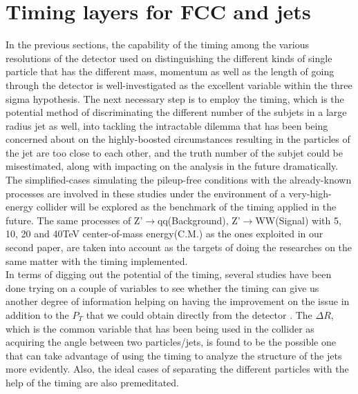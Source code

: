 \section{Timing layers for FCC and jets}
In the previous sections, the capability of the timing among the various resolutions of the detector used on distinguishing the different kinds of single particle that has the different mass, momentum as well as the length of going through the detector is well-investigated as the excellent variable within the three sigma hypothesis. The next necessary step is to employ the timing, which is the potential method of discriminating the different number of the subjets in a large radius jet as well, into tackling the intractable dilemma that has been being concerned about on the highly-boosted circumstances resulting in the particles of the jet are too close to each other, and the truth number of the subjet could be misestimated, along with impacting on the analysis in the future dramatically.\\ 

The simplified-cases simulating the pileup-free conditions with the already-known processes are involved in these studies under the environment of a very-high-energy collider will be explored as the benchmark of the timing applied in the future. The same processes of Z'$\rightarrow$qq(Background), Z'$\rightarrow$WW(Signal) with 5, 10, 20 and 40TeV center-of-mass energy(C.M.) as the ones exploited in our second paper, are taken into account as the targets of doing the researches on the same matter with the timing implemented.\\ 

In terms of digging out the potential of the timing, several studies have been done trying on a couple of variables to see whether the timing can give us another degree of information helping on having the improvement on the issue in addition to the $P_{T}$ that we could obtain directly from the detector . The $\Delta R$, which is the common variable that has been being used in the collider as acquiring the angle between two particles/jets, is found to be the possible one that can take advantage of using the timing to analyze the structure of the jets more evidently. Also, the ideal cases of separating the different particles with the help of the timing are also premeditated.\\

